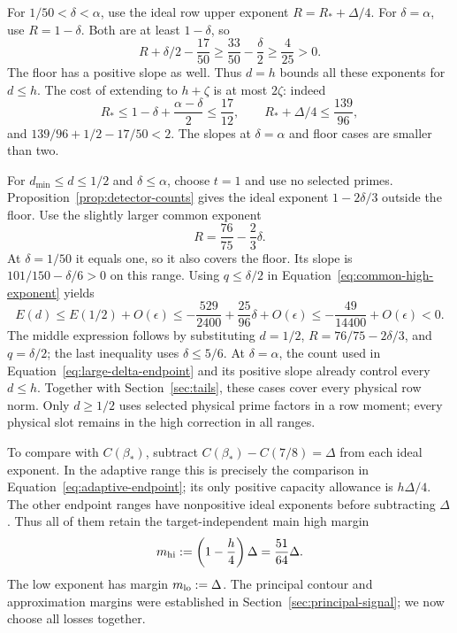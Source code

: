 \documentclass[11pt,a4paper]{article}
\numberwithin{equation}{section}
\numberwithin{figure}{section}
\theoremstyle{definition}
\theoremstyle{remark}
\begin{document}
For \(1/50<\delta<\alpha\), use the ideal row upper exponent
\(R=R_*+\Delta/4\).  For \(\delta=\alpha\), use
\(R=1-\delta\).  Both are at least \(1-\delta\), so
\[
 R+\delta/2-\frac{17}{50}
 \ge\frac{33}{50}-\frac{\delta}{2}\ge\frac4{25}>0.
\]
The floor has a positive slope as well.  Thus \(d=h\) bounds
all these exponents for \(d\le h\).  The cost of extending to
\(h+\zeta\) is at most \(2\zeta\): indeed
\[
 R_*\le1-\delta+\frac{\alpha-\delta}{2}\le\frac{17}{12},
 \qquad
 R_*+\Delta/4\le\frac{139}{96},
\]
and \(139/96+1/2-17/50<2\).  The slopes at \(\delta=\alpha\)
and floor cases are smaller than two.

For \(d_{\min}\le d\le1/2\) and \(\delta\le\alpha\), choose \(t=1\)
and use no selected primes.  Proposition~\ref{prop:detector-counts}
gives the ideal exponent \(1-2\delta/3\) outside the floor.
Use the slightly larger common exponent
\[
 R=\frac{76}{75}-\frac23\delta.
\]
At \(\delta=1/50\) it equals one, so it also covers the floor.
Its slope is \(101/150-\delta/6>0\) on this range.
Using \(q\le\delta/2\) in
Equation~\eqref{eq:common-high-exponent} yields
\begin{equation}
 E(d)\le E(1/2)+O(\epsilon)
 \le-\frac{529}{2400}+\frac{25}{96}\delta+O(\epsilon)
 \le-\frac{49}{14400}+O(\epsilon)<0.
 \label{eq:adaptive-intermediate}
\end{equation}
The middle expression follows by substituting
\(d=1/2\), \(R=76/75-2\delta/3\), and \(q=\delta/2\);
the last inequality uses \(\delta\le5/6\).
At \(\delta=\alpha\), the count used in
Equation~\eqref{eq:large-delta-endpoint} and its positive slope
already control every \(d\le h\).
Together with Section~\ref{sec:tails}, these cases cover every
physical row norm.  Only \(d\ge1/2\) uses selected physical prime factors
in a row moment; every physical slot remains in the high correction in all
ranges.

To compare with \(C(\beta_*)\), subtract
\(C(\beta_*)-C(7/8)=\Delta\) from each ideal exponent.
In the adaptive range this is precisely the comparison in
Equation~\eqref{eq:adaptive-endpoint}; its only positive capacity
allowance is \(h\Delta/4\).  The other endpoint ranges have
nonpositive ideal exponents before subtracting \(\Delta\).
Thus all of them retain the target-independent main high margin
\[
 m_{\rm hi}:=\left(1-\frac h4\right)\Delta
             =\frac{51}{64}\Delta.
\]
The low exponent has margin \(m_{\rm lo}:=\Delta\).
The principal contour and approximation margins were established in
Section~\ref{sec:principal-signal}; we now choose all losses together.
\end{document}
